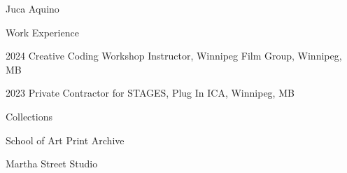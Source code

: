 \documentclass[letterpaper, 12pt]{article}
\begin{document}
\begin{cv}{Juca Aquino}
\begin{cvlist}{Work Experience}
\item[2024] Creative Coding Workshop Instructor, Winnipeg Film Group, Winnipeg, MB
\item[2023] Private Contractor for STAGES, Plug In ICA, Winnipeg, MB
\end{cvlist}

\begin{cvlist}{Collections}
\item[School of Art Print Archive] {}
\item[Martha Street Studio] {}
\end{cvlist}

\end{cv}
\end{document}
